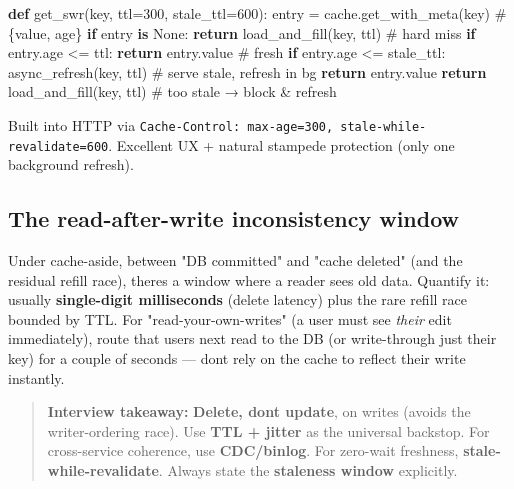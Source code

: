 \documentclass[11pt]{article}
\newenvironment{Shaded}{\begin{snugshade}}{\end{snugshade}}
\newcommand{\CommentTok}[1]{\textcolor[rgb]{0.48,0.49,0.49}{#1}}
\newcommand{\ControlFlowTok}[1]{\textcolor[rgb]{0.99,0.74,0.29}{\textbf{#1}}}
\newcommand{\DecValTok}[1]{\textcolor[rgb]{0.96,0.45,0.00}{#1}}
\newcommand{\KeywordTok}[1]{\textcolor[rgb]{0.81,0.81,0.76}{\textbf{#1}}}
\newcommand{\NormalTok}[1]{\textcolor[rgb]{0.81,0.81,0.76}{#1}}
\newcommand{\OperatorTok}[1]{\textcolor[rgb]{0.81,0.81,0.76}{#1}}
\newcommand{\VariableTok}[1]{\textcolor[rgb]{0.15,0.68,0.68}{#1}}
\begin{document}

\begin{Shaded}
\begin{Highlighting}[]
\KeywordTok{def}\NormalTok{ get\_swr(key, ttl}\OperatorTok{=}\DecValTok{300}\NormalTok{, stale\_ttl}\OperatorTok{=}\DecValTok{600}\NormalTok{):}
\NormalTok{    entry }\OperatorTok{=}\NormalTok{ cache.get\_with\_meta(key)             }\CommentTok{\# \{value, age\}}
    \ControlFlowTok{if}\NormalTok{ entry }\KeywordTok{is} \VariableTok{None}\NormalTok{:}
        \ControlFlowTok{return}\NormalTok{ load\_and\_fill(key, ttl)           }\CommentTok{\# hard miss}
    \ControlFlowTok{if}\NormalTok{ entry.age }\OperatorTok{\textless{}=}\NormalTok{ ttl:}
        \ControlFlowTok{return}\NormalTok{ entry.value                       }\CommentTok{\# fresh}
    \ControlFlowTok{if}\NormalTok{ entry.age }\OperatorTok{\textless{}=}\NormalTok{ stale\_ttl:}
\NormalTok{        async\_refresh(key, ttl)                  }\CommentTok{\# serve stale, refresh in bg}
        \ControlFlowTok{return}\NormalTok{ entry.value}
    \ControlFlowTok{return}\NormalTok{ load\_and\_fill(key, ttl)               }\CommentTok{\# too stale → block \& refresh}
\end{Highlighting}
\end{Shaded}

Built into HTTP via \texttt{Cache-Control:\ max-age=300,\ stale-while-revalidate=600}. Excellent UX + natural stampede protection (only one background refresh).

\subsection{The read-after-write inconsistency window}\label{the-read-after-write-inconsistency-window}

Under cache-aside, between "DB committed" and "cache deleted" (and the residual refill race), there\textquotesingle s a window where a reader sees old data. Quantify it: usually \textbf{single-digit milliseconds} (delete latency) plus the rare refill race bounded by TTL. For "read-your-own-writes" (a user must see \emph{their} edit immediately), route that user\textquotesingle s next read to the DB (or write-through just their key) for a couple of seconds --- don\textquotesingle t rely on the cache to reflect their write instantly.

\begin{quote}
\textbf{Interview takeaway:} \textbf{Delete, don\textquotesingle t update}, on writes (avoids the writer-ordering race). Use \textbf{TTL + jitter} as the universal backstop. For cross-service coherence, use \textbf{CDC/binlog}. For zero-wait freshness, \textbf{stale-while-revalidate}. Always state the \textbf{staleness window} explicitly.
\end{quote}
\end{document}
